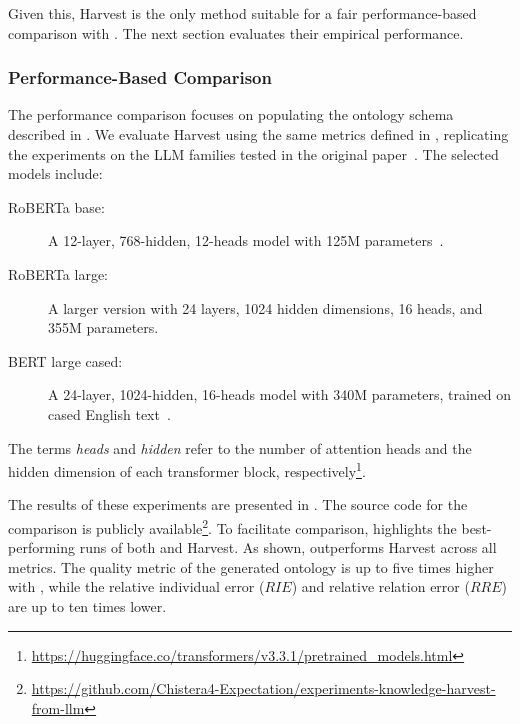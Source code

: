 Given this, Harvest is the only method suitable for a fair performance-based comparison with \llmfkg{}.
%
The next section evaluates their empirical performance.



\subsubsection{Performance-Based Comparison}
\label{subsubsec:comparison-performance}
%


The performance comparison focuses on populating the ontology schema described in .
%
We evaluate Harvest using the same metrics defined in , replicating the experiments on the \gls{LLM} families tested in the original paper~\cite{HaoTTNSZXH23}.
%
The selected models include:
%
\begin{description}
    \item[RoBERTa base:] A 12-layer, 768-hidden, 12-heads model with 125M parameters~\cite{roberta-2019}.
    \item[RoBERTa large:] A larger version with 24 layers, 1024 hidden dimensions, 16 heads, and 355M parameters.
    \item[BERT large cased:] A 24-layer, 1024-hidden, 16-heads model with 340M parameters, trained on cased English text~\cite{DBLP:conf/naacl/DevlinCLT19}.
\end{description}
%
The terms \emph{heads} and \emph{hidden} refer to the number of attention heads and the hidden dimension of each transformer block, respectively\footnote{\url{https://huggingface.co/transformers/v3.3.1/pretrained_models.html}}.

The results of these experiments are presented in .
%
The source code for the comparison is publicly available\footnote{\url{https://github.com/Chistera4-Expectation/experiments-knowledge-harvest-from-llm}}.
%
To facilitate comparison,  highlights the best-performing runs of both \llmfkg{} and Harvest.
%
As shown, \llmfkg{} outperforms Harvest across all metrics.
%
The quality metric of the generated ontology is up to five times higher with \llmfkg{}, while the relative individual error (\(RIE\)) and relative relation error (\(RRE\)) are up to ten times lower.

